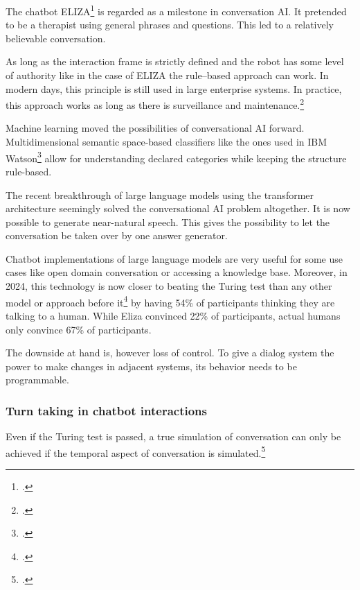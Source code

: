 \documentclass[12pt]{report}
\begin{document}
{\par
The chatbot ELIZA\footcite{weizenbaum1966eliza} is regarded as a milestone in conversation AI.
It pretended to be a therapist
using general phrases and questions.
This led to a relatively believable conversation.

As long as the interaction frame is strictly defined and
the robot has some level of authority
like in the case of ELIZA
the rule–based approach can work.
In modern days, this principle is still used in large enterprise systems.
In practice, this approach works as long as there is surveillance and maintenance.\footcite{kolosova2022}

\par
Machine learning moved the possibilities of conversational AI forward.
Multidimensional semantic space-based classifiers like the ones used in IBM Watson\footcite{building_watson_2010}
allow for understanding declared categories while keeping the structure rule-based.

\par
The recent breakthrough of large language models using the transformer architecture
seemingly solved the conversational AI problem altogether.
It is now possible to generate near-natural speech.
This gives the possibility to let the conversation be taken over by one answer generator.

Chatbot implementations of large language models are very useful for some use cases
like open domain conversation or accessing a knowledge base.
Moreover, in 2024, this technology is now closer to beating the Turing test than
any other model or approach before it\footcite{jones2024peopledistinguishgpt4human}
by having 54\% of participants thinking
they are talking to a human.
While Eliza convinced 22\% of participants,
actual humans only convince 67\% of participants.

\par The downside at hand is, however loss of control.
To give a dialog system the power to make changes in adjacent systems,
its behavior needs to be programmable.

\subsubsection{Turn taking in chatbot interactions}

\par
Even if the Turing test is passed,
a true simulation of conversation
can only be achieved if the temporal aspect of conversation
is simulated.\footcite{optimizing-turn-taking}

}
\end{document}
